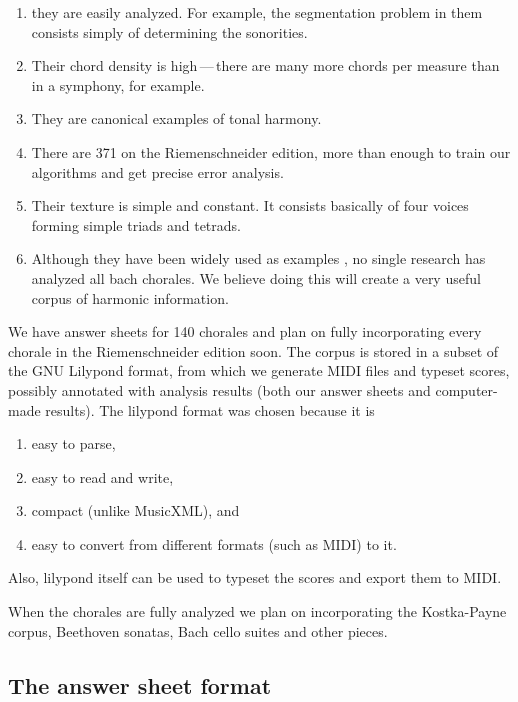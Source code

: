 \documentclass{article}
\begin{document}
\begin{enumerate}
\item they are easily analyzed. For example, the segmentation problem in
them consists simply of determining the sonorities.
\item Their chord density is high\,---\,there are many more chords per
  measure than in a symphony, for example.
\item They are canonical examples of tonal harmony.
\item There are 371 on the Riemenschneider edition, more than
  enough to train our algorithms and get precise error analysis.
\item Their texture is simple and constant. It consists basically of
  four voices forming simple triads and tetrads.
\item Although they have been widely used as examples
  \cite{taube:automatic, tsui:harmonic, illescas.ea:harmonic,
    winograd:linguistics}, no single research has analyzed all bach
  chorales. We believe doing this will create a very useful corpus of
  harmonic information.
\end{enumerate}

We have answer sheets for 140 chorales and plan on fully incorporating
every chorale in the Riemenschneider \cite{bach:371} edition soon. The
corpus is stored in a subset of the GNU Lilypond format, from which we
generate MIDI files and typeset scores, possibly annotated with
analysis results (both our answer sheets and computer-made
results). The lilypond format was chosen because it is

\begin{enumerate}
\item easy to parse,
\item easy to read and write,
\item compact (unlike MusicXML), and
\item easy to convert from different formats (such as MIDI) to it.
\end{enumerate}

Also, lilypond itself can be used to typeset the scores and export
them to MIDI.

When the chorales are fully analyzed we plan on incorporating the
Kostka-Payne \cite{kostka.ea:tonal} corpus, Beethoven sonatas, Bach
cello suites and other pieces.

\subsection{The answer sheet format}
\label{sec:formato-dos-acordes}
\end{document}

